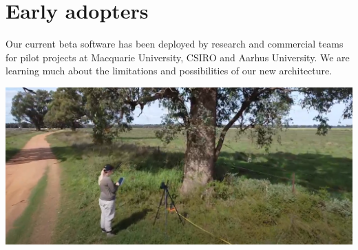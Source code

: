 \documentclass[a0,portrait]{a0poster}
\begin{document}
\begin{multicols}{3}
\begin{center}
\end{center}

\section*{Early adopters}

Our current beta software has been deployed by research and commercial teams for pilot projects at Macquarie University, CSIRO and Aarhus University. We are learning much about the limitations and possibilities of our new architecture.


\begin{center}
    \includegraphics[width=\linewidth]{figures/Screenshot from 2022-10-13 10-58-35.png}
\end{center}









\end{multicols}
\end{document}
